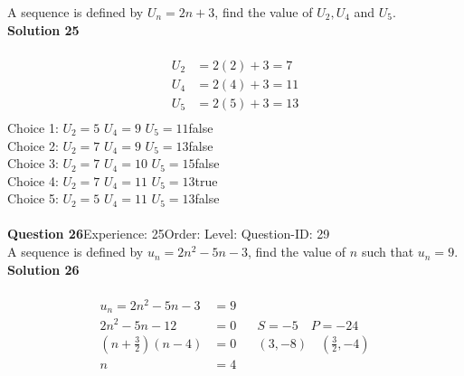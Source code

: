 \documentclass{article}
\begin{document}
A sequence is defined by $U_n=2n+3$, find the value of $U_2, U_4$ and $U_5$.\\[4pt]
\noindent\textbf{Solution 25}\\[2pt]
\\[-35pt]\begin{align*}
U_2&=2(2)+3=7\\[2pt]
U_4&=2(4)+3=11\\[2pt]
U_5&=2(5)+3=13\\[2pt]
\end{align*}
Choice 1: \hspace{20pt}$U_2=5 \,\, U_4=9 \,\, U_5=11$\hspace{20pt}false\\
Choice 2: \hspace{20pt}$U_2=7 \,\, U_4=9 \,\, U_5=13$\hspace{20pt}false\\
Choice 3: \hspace{20pt}$U_2=7 \,\, U_4=10 \,\, U_5=15$\hspace{20pt}false\\
Choice 4: \hspace{20pt}$U_2=7 \,\, U_4=11 \,\, U_5=13$\hspace{20pt}true\\
Choice 5: \hspace{20pt}$U_2=5 \,\, U_4=11 \,\, U_5=13$\hspace{20pt}false\\
\\[4pt]
\noindent\textbf{Question 26}\hspace{20pt}Experience: 25\hspace{20pt}Order: \hspace{20pt}Level: \hspace{20pt}Question-ID: 29\\[2pt]
A sequence is defined by $u_n=2n^2-5n-3$, find the value of $n$ such that $u_n=9$.\\[4pt]
\noindent\textbf{Solution 26}\\[2pt]
\\[-35pt]\begin{align*}
u_n=2n^2-5n-3&=9\\[2pt]
2n^2-5n-12&=0\hspace{20pt}S=-5 \quad P=-24\\[2pt]
\left(n+\displaystyle\frac{3}{2}\right)(n-4)&=0\hspace{20pt} (3,-8)\quad\left(\displaystyle\frac{3}{2},-4\right)\\[2pt]
n&=4
\end{align*}
\end{document}
